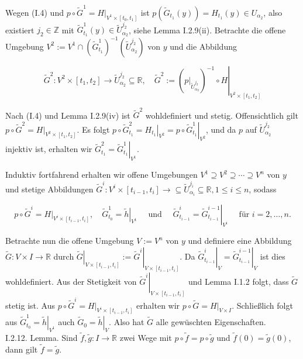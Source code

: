 \documentclass[10pt, letterpaper]{article}
\begin{document}
Wegen (I.4) und $p \circ \tilde{G}^{1}=\left.H\right|_{V^{1} \times\left[t_{0}, t_{1}\right]}$ ist $p\left(\tilde{G}_{t_{1}}(y)\right)=H_{t_{1}}(y) \in U_{\alpha_{2}}$, also existiert $j_{2} \in \mathbb{Z}$ mit $\tilde{G}_{t_{1}}^{1}(y) \in \tilde{U}_{\alpha_{2}}^{j_{2}}$, siehe Lemma I.2.9(ii). Betrachte die offene Umgebung $V^{2}:=V^{1} \cap\left(\tilde{G}_{t_{1}}^{1}\right)^{-1}\left(\tilde{U}_{\alpha_{2}}^{j_{2}}\right)$ von $y$ und die Abbildung

$$
\tilde{G}^{2}: V^{2} \times\left[t_{1}, t_{2}\right] \rightarrow \tilde{U}_{\alpha_{2}}^{j_{2}} \subseteq \mathbb{R}, \quad \tilde{G}^{2}:=\left.\left(\left.p\right|_{\tilde{U}_{\alpha_{2}}^{j_{2}}}\right)^{-1} \circ H\right|_{V^{2} \times\left[t_{1}, t_{2}\right]}
$$

Nach (I.4) und Lemma I.2.9(iv) ist $\tilde{G}^{2}$ wohldefiniert und stetig. Offensichtlich gilt $p \circ \tilde{G}^{2}=\left.H\right|_{V^{2} \times\left[t_{1}, t_{2}\right]}$. Es folgt $p \circ \tilde{G}_{t_{1}}^{2}=\left.H_{t_{1}}\right|_{V^{2}}=\left.p \circ \tilde{G}_{t_{1}}^{1}\right|_{V^{2}}$, und da $p$ auf $\tilde{U}_{\alpha_{2}}^{j_{2}}$ injektiv ist, erhalten wir $\tilde{G}_{t_{1}}^{2}=\left.\tilde{G}_{t_{1}}^{1}\right|_{V^{1}}$.

Induktiv fortfahrend erhalten wir offene Umgebungen $V^{1} \supseteq V^{2} \supseteq \cdots \supseteq V^{n}$ von $y$ und stetige Abbildungen $\tilde{G}^{i}: V^{i} \times\left[t_{i-1}, t_{i}\right] \rightarrow \subseteq \tilde{U}_{\alpha_{i}}^{j_{i}} \subseteq \mathbb{R}, 1 \leq i \leq n$, sodass

$$
p \circ \tilde{G}^{i}=\left.H\right|_{V^{i} \times\left[t_{i-1}, t_{i}\right]}, \quad \tilde{G}_{t_{0}}^{1}=\left.\tilde{h}\right|_{V^{1}} \quad \text { und } \quad \tilde{G}_{t_{i-1}}^{i}=\left.\tilde{G}_{t_{i-1}}^{i-1}\right|_{V^{i}} \quad \text { für } i=2, \ldots, n .
$$

Betrachte nun die offene Umgebung $V:=V^{n}$ von $y$ und definiere eine Abbildung $\tilde{G}: V \times I \rightarrow \mathbb{R}$ durch $\left.\tilde{G}\right|_{V \times\left[t_{i-1}, t_{i}\right]}:=\left.\tilde{G}^{i}\right|_{V \times\left[t_{i-1}, t_{i}\right]}$. Da $\left.\tilde{G}_{t_{i-1}}^{i}\right|_{V}=\left.\tilde{G}_{t_{i-1}}^{i-1}\right|_{V}$ ist dies wohldefiniert. Aus der Stetigkeit von $\left.\tilde{G}^{i}\right|_{V \times\left[t_{i-1}, t_{i}\right]}$ und Lemma I.1.2 folgt, dass $\tilde{G}$ stetig ist. Aus $p \circ \tilde{G}^{i}=\left.H\right|_{V^{i} \times\left[t_{i-1}, t_{i}\right]}$ erhalten wir $p \circ \tilde{G}=\left.H\right|_{V \times I}$. Schließlich folgt aus $\tilde{G}_{t_{0}}^{1}=\left.\tilde{h}\right|_{V^{1}}$ auch $\tilde{G}_{0}=\left.\tilde{h}\right|_{V}$. Also hat $\tilde{G}$ alle gewüschten Eigenschaften.\\
I.2.12. Lemma. Sind $\tilde{f}, \tilde{g}: I \rightarrow \mathbb{R}$ zwei Wege mit $p \circ \tilde{f}=p \circ \tilde{g}$ und $\tilde{f}(0)=\tilde{g}(0)$, dann gilt $\tilde{f}=\tilde{g}$.
\end{document}
